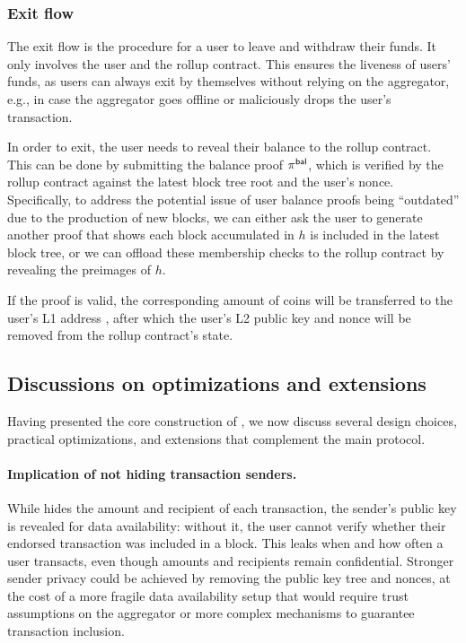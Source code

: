\subsubsection{Exit flow}

The exit flow is the procedure for a user to leave \Protocol and withdraw their funds.
It only involves the user and the rollup contract.
This ensures the liveness of users' funds, as users can always exit by themselves without relying on the aggregator, e.g., in case the aggregator goes offline or maliciously drops the user's transaction.

In order to exit, the user needs to reveal their balance to the rollup contract.
This can be done by submitting the balance proof $\pi^\mathsf{bal}$, which is verified by the rollup contract against the latest block tree root and the user's nonce.
Specifically, to address the potential issue of user balance proofs being ``outdated'' due to the production of new blocks, we can either ask the user to generate another proof that shows each block accumulated in $h$ is included in the latest block tree, or we can offload these membership checks to the rollup contract by revealing the preimages of $h$.

If the proof is valid, the corresponding amount of coins will be transferred to the user's \ac{L1} address \Address, after which the user's \ac{L2} public key and nonce will be removed from the rollup contract's state.

\subsection{Discussions on optimizations and extensions}

Having presented the core construction of \Protocol, we now discuss several design choices, practical optimizations, and extensions that complement the main protocol.

\paragraph{Implication of not hiding transaction senders.}

While \Protocol hides the amount and recipient of each transaction, the sender's public key is revealed for data availability: without it, the user cannot verify whether their endorsed transaction was included in a block.
This leaks when and how often a user transacts, even though amounts and recipients remain confidential.
Stronger sender privacy could be achieved by removing the public key tree and nonces, at the cost of a more fragile data availability setup that would require trust assumptions on the aggregator or more complex mechanisms to guarantee transaction inclusion.

